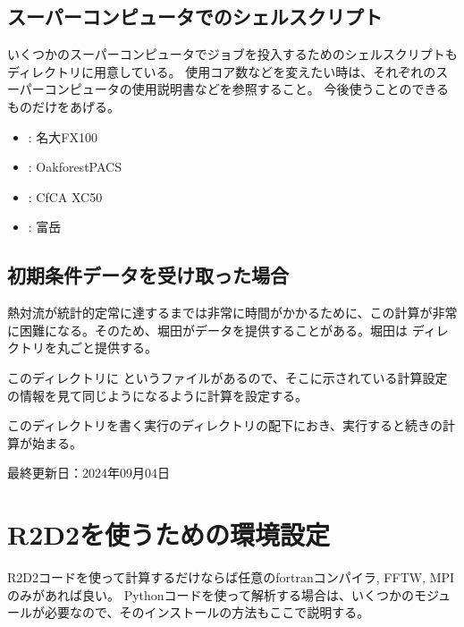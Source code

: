 \documentclass[letterpaper,10pt,dvipdfmx,report]{sphinxmanual}
\begin{document}
\section{スーパーコンピュータでのシェルスクリプト}
\label{\detokenize{start:id5}}
\sphinxAtStartPar
いくつかのスーパーコンピュータでジョブを投入するためのシェルスクリプトも  ディレクトリに用意している。
使用コア数などを変えたい時は、それぞれのスーパーコンピュータの使用説明書などを参照すること。
今後使うことのできるものだけをあげる。
\begin{itemize}
\item {} 
\sphinxAtStartPar
{} : 名大FX100

\item {} 
\sphinxAtStartPar
{} : Oakforest\sphinxhyphen{}PACS

\item {} 
\sphinxAtStartPar
{} : CfCA XC50

\item {} 
\sphinxAtStartPar
{} : 富岳

\end{itemize}


\section{初期条件データを受け取った場合}
\label{\detokenize{start:id6}}
\sphinxAtStartPar
熱対流が統計的定常に達するまでは非常に時間がかかるために、この計算が非常に困難になる。そのため、堀田がデータを提供することがある。堀田は  ディレクトリを丸ごと提供する。

\sphinxAtStartPar
このディレクトリに  というファイルがあるので、そこに示されている計算設定の情報を見て同じようになるように計算を設定する。

\sphinxAtStartPar
このディレクトリを書く実行のディレクトリの配下におき、実行すると続きの計算が始まる。

\sphinxAtStartPar
最終更新日：2024年09月04日

\sphinxstepscope


\chapter{R2D2を使うための環境設定}
\label{\detokenize{environment:r2d2}}\label{\detokenize{environment::doc}}
\sphinxAtStartPar
R2D2コードを使って計算するだけならば任意のfortranコンパイラ, FFTW, MPIのみがあれば良い。
Pythonコードを使って解析する場合は、いくつかのモジュールが必要なので、そのインストールの方法もここで説明する。
\end{document}
